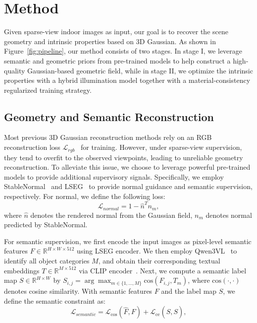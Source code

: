 \section{Method}

Given sparse-view indoor images as input, our goal is to recover the scene geometry and intrinsic properties based on 3D Gaussian. As shown in Figure~\ref{fig:pipeline}, our method consists of two stages. In stage I, we leverage semantic and geometric priors from pre-trained models to help construct a high-quality Gaussian-based geometric field, while in stage II, we optimize the intrinsic properties with a hybrid illumination model together with a material-consistency regularized training strategy.


\subsection{Geometry and Semantic Reconstruction}
\label{sec:geo_sem_init}

Most previous 3D Gaussian reconstruction methods rely on an RGB reconstruction loss $\mathcal{L}_{rgb}$~\cite{kerbl20233d} for training. However, under sparse-view supervision, they tend to overfit to the observed viewpoints, leading to unreliable geometry reconstruction. To alleviate this issue, we choose to leverage powerful pre-trained models to provide additional supervisory signals. Specifically, we employ StableNormal~\cite{ye2024stablenormal} and LSEG~\cite{li2022language} to provide normal guidance and semantic supervision, respectively. For normal, we define the following loss:
\begin{equation}
    \mathcal{L}_{normal} = 1 - \hat{n}^T n_m,
\end{equation}
where $\hat{n}$ denotes the rendered normal from the Gaussian field, $n_m$ denotes normal predicted by StableNormal.

For semantic supervision, we first encode the input images as pixel-level semantic features $F \in \mathbb{R}^{H \times W \times 512}$ using LSEG encoder. We then employ Qwen3VL~\cite{bai2025qwen3} to identify all object categories $M$, and obtain their corresponding textual embeddings $T \in \mathbb{R}^{M \times 512}$ via CLIP encoder~\cite{radford2021learning}. Next, we compute a semantic label map $S \in \mathbb{R}^{H \times W}$ by $S_{i,j} = \arg\max_{m \in \{1, \dots, M\}} \text{cos}(F_{i,j}, T_m)$, where $\text{cos}(\cdot, \cdot)$ denotes cosine similarity. With semantic features $F$ and the label map $S$, we define the semantic constraint as:
\begin{equation}
    \mathcal{L}_{semantic} = \mathcal{L}_{\text{cos}}(\hat{F}, F) + \mathcal{L}_{\text{ce}}(\hat{S}, S),
\end{equation}

